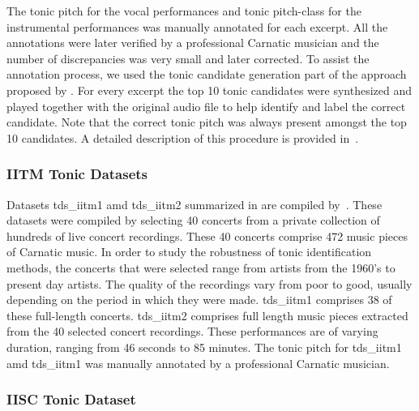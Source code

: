 {The tonic pitch for the vocal performances and tonic pitch-class for the instrumental performances was manually annotated for each excerpt. All the annotations were later verified by a professional Carnatic musician and the number of discrepancies was very small and later corrected. To assist the annotation process, we used the tonic candidate generation part of the approach proposed by \cite{salamon2012multipitch}. For every excerpt the top 10 tonic candidates were synthesized and played together with the original audio file to help identify and label the correct candidate. Note that the correct tonic pitch was always present amongst the top 10 candidates. A detailed description of this procedure is provided in~\cite{SGulati_MThesis2012}.



\subsubsection{IITM Tonic Datasets}
\label{sec:corpus_iitm_tonic_datasets}

Datasets \acrshort{tds_iitm1} amd \acrshort{tds_iitm2} summarized in  are compiled by~\cite{bellur2012knowledge}. These datasets were compiled by selecting 40 concerts from a private collection of hundreds of live concert recordings. These 40 concerts comprise 472 music pieces of Carnatic music. In order to study the robustness of tonic identification methods, the concerts that were selected range from artists from the 1960's to present day artists. The quality of the recordings vary from poor to good, usually depending on the period in which they were made. \acrshort{tds_iitm1} comprises 38 of these full-length concerts. \acrshort{tds_iitm2} comprises full length music pieces extracted from the 40 selected concert recordings. These performances are of varying duration, ranging from 46 seconds to 85 minutes. The tonic pitch for \acrshort{tds_iitm1} amd \acrshort{tds_iitm1} was manually annotated by a professional Carnatic musician.


\subsubsection{IISC Tonic Dataset}
\label{sec:corpus_iisc_tonic_dataset}

}
